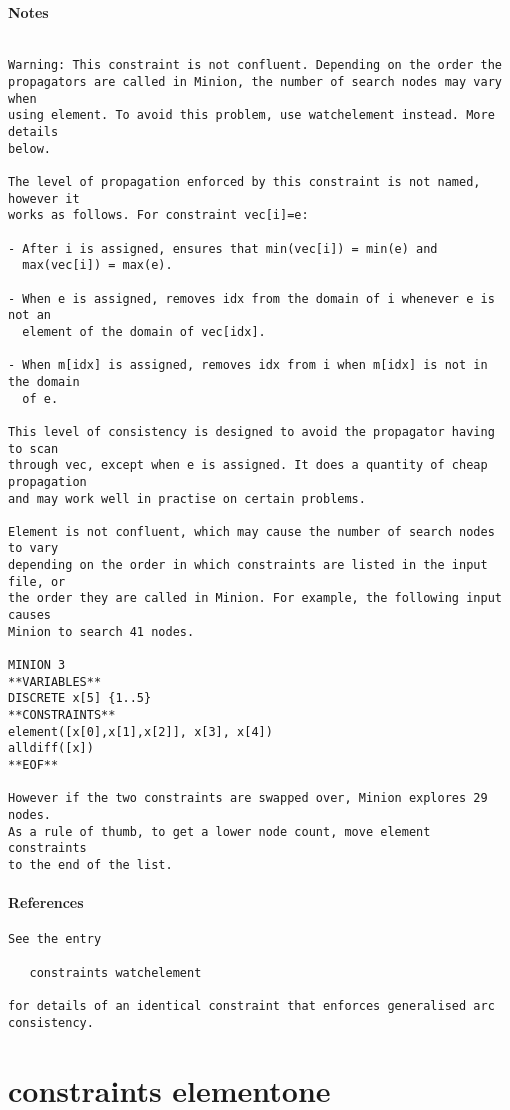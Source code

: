 \paragraph{Notes}
{\footnotesize
\begin{verbatim}

Warning: This constraint is not confluent. Depending on the order the
propagators are called in Minion, the number of search nodes may vary when
using element. To avoid this problem, use watchelement instead. More details
below.

The level of propagation enforced by this constraint is not named, however it
works as follows. For constraint vec[i]=e:

- After i is assigned, ensures that min(vec[i]) = min(e) and
  max(vec[i]) = max(e).

- When e is assigned, removes idx from the domain of i whenever e is not an
  element of the domain of vec[idx].

- When m[idx] is assigned, removes idx from i when m[idx] is not in the domain
  of e.

This level of consistency is designed to avoid the propagator having to scan
through vec, except when e is assigned. It does a quantity of cheap propagation
and may work well in practise on certain problems.

Element is not confluent, which may cause the number of search nodes to vary
depending on the order in which constraints are listed in the input file, or
the order they are called in Minion. For example, the following input causes
Minion to search 41 nodes.

MINION 3
**VARIABLES**
DISCRETE x[5] {1..5}
**CONSTRAINTS**
element([x[0],x[1],x[2]], x[3], x[4])
alldiff([x])
**EOF**

However if the two constraints are swapped over, Minion explores 29 nodes.
As a rule of thumb, to get a lower node count, move element constraints
to the end of the list.
\end{verbatim}
}
\paragraph{References}
{\footnotesize
\begin{verbatim}
See the entry

   constraints watchelement

for details of an identical constraint that enforces generalised arc
consistency.
\end{verbatim}
}
\section{constraints element\textunderscore one}
